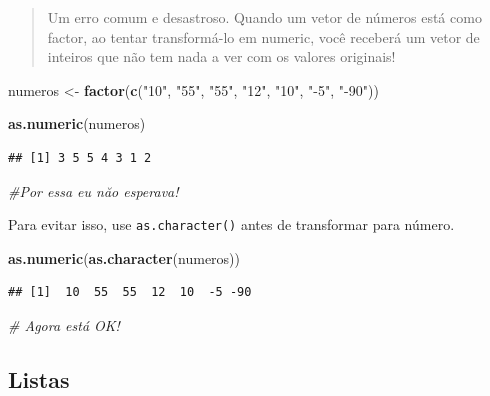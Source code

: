 \documentclass[
]{book}
\newenvironment{Shaded}{\begin{snugshade}}{\end{snugshade}}
\newcommand{\CommentTok}[1]{\textcolor[rgb]{0.56,0.35,0.01}{\textit{#1}}}
\newcommand{\KeywordTok}[1]{\textcolor[rgb]{0.13,0.29,0.53}{\textbf{#1}}}
\newcommand{\NormalTok}[1]{#1}
\newcommand{\StringTok}[1]{\textcolor[rgb]{0.31,0.60,0.02}{#1}}
\begin{document}
\begin{quote}
Um erro comum e desastroso. Quando um vetor de números está como factor, ao tentar transformá-lo em numeric, você receberá um vetor de inteiros que não tem nada a ver com os valores originais!
\end{quote}

\begin{Shaded}
\begin{Highlighting}[]
\NormalTok{numeros <{-}}\StringTok{ }\KeywordTok{factor}\NormalTok{(}\KeywordTok{c}\NormalTok{(}\StringTok{"10"}\NormalTok{, }\StringTok{"55"}\NormalTok{, }\StringTok{"55"}\NormalTok{, }\StringTok{"12"}\NormalTok{, }\StringTok{"10"}\NormalTok{, }\StringTok{"{-}5"}\NormalTok{, }\StringTok{"{-}90"}\NormalTok{))}

\KeywordTok{as.numeric}\NormalTok{(numeros)}
\end{Highlighting}
\end{Shaded}

\begin{verbatim}
## [1] 3 5 5 4 3 1 2
\end{verbatim}

\begin{Shaded}
\begin{Highlighting}[]
\CommentTok{\#Por essa eu năo esperava!}
\end{Highlighting}
\end{Shaded}

Para evitar isso, use \texttt{as.character()} antes de transformar para número.

\begin{Shaded}
\begin{Highlighting}[]
\KeywordTok{as.numeric}\NormalTok{(}\KeywordTok{as.character}\NormalTok{(numeros))}
\end{Highlighting}
\end{Shaded}

\begin{verbatim}
## [1]  10  55  55  12  10  -5 -90
\end{verbatim}

\begin{Shaded}
\begin{Highlighting}[]
\CommentTok{\# Agora está OK!}
\end{Highlighting}
\end{Shaded}

\hypertarget{listas}{%
\subsection{Listas}\label{listas}}
\end{document}
